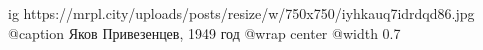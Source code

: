  
 
 
 
 

\ifcmt
  ig https://mrpl.city/uploads/posts/resize/w/750x750/iyhkauq7idrdqd86.jpg
	@caption Яков Привезенцев, 1949 год
  @wrap center
  @width 0.7
\fi
